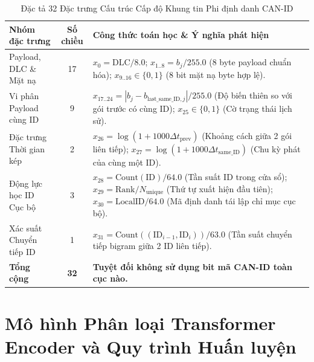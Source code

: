 \documentclass[12pt, a4paper, reqno, oneside]{book}
\begin{document}
\begin{table}[htbp]
\centering
\caption{Đặc tả 32 Đặc trưng Cấu trúc Cấp độ Khung tin Phi định danh CAN-ID}
\label{tab:struct_features}
\renewcommand{\arraystretch}{1.2}
\small
\begin{tabular}{p{3.5cm} c p{8.0cm}}
\hline
\textbf{Nhóm đặc trưng} & \textbf{Số chiều} & \textbf{Công thức toán học \& Ý nghĩa phát hiện} \\
\hline
Payload, DLC \& Mặt nạ & 17 & $x_0 = \text{DLC}/8.0$; $x_{1..8} = b_j/255.0$ (8 byte payload chuẩn hóa); $x_{9..16} \in \{0, 1\}$ (8 bit mặt nạ byte hợp lệ). \\
Vi phân Payload cùng ID & 9 & $x_{17..24} = |b_j - b_{\text{last\_same\_ID}, j}|/255.0$ (Độ biến thiên so với gói trước có cùng ID); $x_{25} \in \{0, 1\}$ (Cờ trạng thái lịch sử). \\
Đặc trưng Thời gian kép & 2 & $x_{26} = \log(1 + 1000\Delta t_{\text{prev}})$ (Khoảng cách giữa 2 gói liên tiếp); $x_{27} = \log(1 + 1000\Delta t_{\text{same\_ID}})$ (Chu kỳ phát của cùng một ID). \\
Động lực học ID Cục bộ & 3 & $x_{28} = \text{Count}(\text{ID})/64.0$ (Tần suất ID trong cửa sổ); $x_{29} = \text{Rank}/N_{\text{unique}}$ (Thứ tự xuất hiện đầu tiên); $x_{30} = \text{LocalID}/64.0$ (Mã định danh tái lập chỉ mục cục bộ). \\
Xác suất Chuyển tiếp ID & 1 & $x_{31} = \text{Count}((\text{ID}_{i-1}, \text{ID}_i))/63.0$ (Tần suất chuyển tiếp bigram giữa 2 ID liên tiếp). \\
\hline
\textbf{Tổng cộng} & \textbf{32} & \textbf{Tuyệt đối không sử dụng bit mã CAN-ID toàn cục nào.} \\
\hline
\end{tabular}
\end{table}

\section{Mô hình Phân loại Transformer Encoder và Quy trình Huấn luyện}
\label{sec:method_model}
\end{document}
